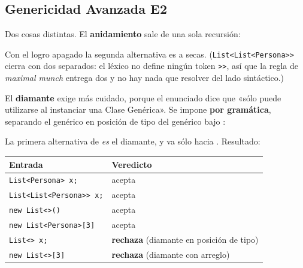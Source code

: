 \subsection{Genericidad Avanzada E2}

Dos cosas distintas. El \textbf{anidamiento} sale de una sola recursión:
\begin{producciones}
\end{producciones}
Con el logro apagado la segunda alternativa es  a secas. (\texttt{List<List<Persona>>}
cierra con dos \tl{>} separados: el léxico no define ningún token \texttt{>>}, así que la regla de
\emph{maximal munch} entrega dos \tl{>} y no hay nada que resolver del lado sintáctico.)

El \textbf{diamante} exige más cuidado, porque el enunciado dice que «sólo puede utilizarse al
instanciar una Clase Genérica». Se impone \textbf{por gramática}, separando el genérico en posición
de tipo del genérico bajo :
\begin{producciones}
\end{producciones}
La primera alternativa de  \emph{es} el diamante, y va sólo hacia
. Resultado:

\begin{center}
\begin{tabular}{@{}ll@{}}
\toprule
\textbf{Entrada} & \textbf{Veredicto} \\
\midrule
\texttt{List<Persona> x;}        & acepta \\
\texttt{List<List<Persona>> x;}  & acepta \\
\texttt{new List<>()}            & acepta \\
\texttt{new List<Persona>[3]}    & acepta \\
\texttt{List<> x;}               & \textbf{rechaza} (diamante en posición de tipo) \\
\texttt{new List<>[3]}           & \textbf{rechaza} (diamante con arreglo) \\
\bottomrule
\end{tabular}
\end{center}

